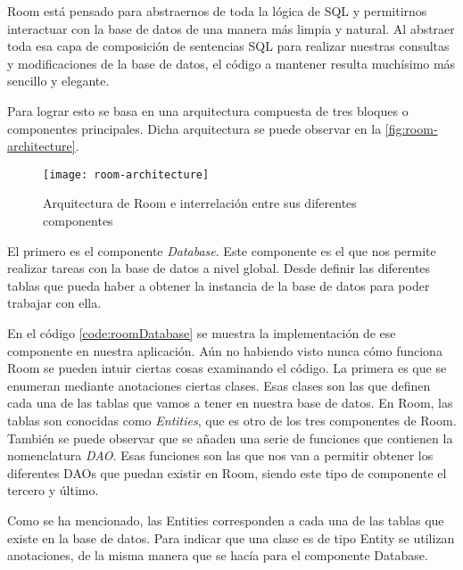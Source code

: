 Room está pensado para abstraernos de toda la lógica de SQL y permitirnos interactuar con la base de datos de una manera más limpia y natural. Al abstraer toda esa capa de composición de sentencias SQL para realizar nuestras consultas y modificaciones de la base de datos, el código a mantener resulta muchísimo más sencillo y elegante.

Para lograr esto se basa en una arquitectura compuesta de tres bloques o componentes principales. Dicha arquitectura se puede observar en la \autoref{fig:room-architecture}.

\begin{figure}[H]
	\centering
	\texttt{[image: room-architecture]}
	\caption{Arquitectura de Room e interrelación entre sus diferentes componentes}
	\label{fig:room-architecture}
\end{figure}

El primero es el componente \textit{Database}. Este componente es el que nos permite realizar tareas con la base de datos a nivel global. Desde definir las diferentes tablas que pueda haber a obtener la instancia de la base de datos para poder trabajar con ella.

\begin{code}
	\caption{Implementación de la clase AppDatabase}
	\label{code:roomDatabase}
	
\end{code}

En el código \ref{code:roomDatabase} se muestra la  implementación de ese componente en nuestra aplicación. Aún no habiendo visto nunca cómo funciona Room se pueden intuir ciertas cosas examinando el código. La primera es que se enumeran mediante anotaciones ciertas clases. Esas clases son las que definen cada una de las tablas que vamos a tener en nuestra base de datos. En Room, las tablas son conocidas como \textit{Entities}, que es otro de los tres componentes de Room. También se puede observar que se añaden una serie de funciones que contienen la nomenclatura \textit{DAO}. Esas funciones son las que nos van a permitir obtener los diferentes DAOs que puedan existir en Room, siendo este tipo de componente el tercero y último.

Como se ha mencionado, las Entities corresponden a cada una de las tablas que existe en la base de datos. Para indicar que una clase es de tipo Entity se utilizan anotaciones, de la misma manera que se hacía para el componente Database.

